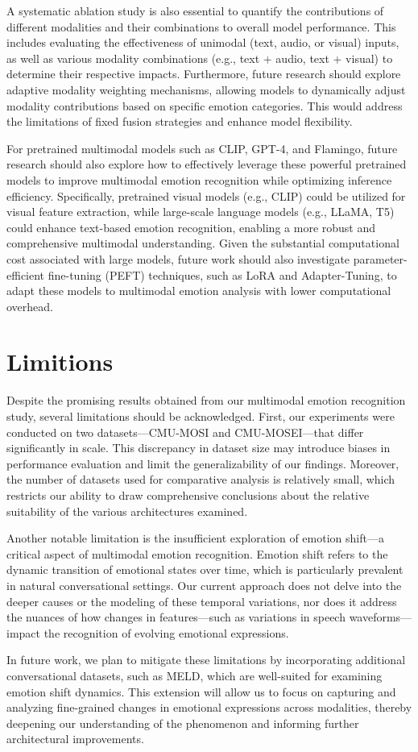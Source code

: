 \documentclass{article}
\begin{document}
A systematic ablation study is also essential to quantify the contributions of different modalities and their combinations to overall model performance. This includes evaluating the effectiveness of unimodal (text, audio, or visual) inputs, as well as various modality combinations (e.g., text + audio, text + visual) to determine their respective impacts. Furthermore, future research should explore adaptive modality weighting mechanisms, allowing models to dynamically adjust modality contributions based on specific emotion categories. This would address the limitations of fixed fusion strategies and enhance model flexibility.

For pretrained multimodal models such as CLIP, GPT-4, and Flamingo, future research should also explore how to effectively leverage these powerful pretrained models to improve multimodal emotion recognition while optimizing inference efficiency. Specifically, pretrained visual models (e.g., CLIP) could be utilized for visual feature extraction, while large-scale language models (e.g., LLaMA, T5) could enhance text-based emotion recognition, enabling a more robust and comprehensive multimodal understanding. Given the substantial computational cost associated with large models, future work should also investigate parameter-efficient fine-tuning (PEFT) techniques, such as LoRA and Adapter-Tuning, to adapt these models to multimodal emotion analysis with lower computational overhead.

\section{Limitions}
Despite the promising results obtained from our multimodal emotion recognition study, several limitations should be acknowledged. First, our experiments were conducted on two datasets—CMU-MOSI and CMU-MOSEI—that differ significantly in scale. This discrepancy in dataset size may introduce biases in performance evaluation and limit the generalizability of our findings. Moreover, the number of datasets used for comparative analysis is relatively small, which restricts our ability to draw comprehensive conclusions about the relative suitability of the various architectures examined.

Another notable limitation is the insufficient exploration of emotion shift—a critical aspect of multimodal emotion recognition. Emotion shift refers to the dynamic transition of emotional states over time, which is particularly prevalent in natural conversational settings. Our current approach does not delve into the deeper causes or the modeling of these temporal variations, nor does it address the nuances of how changes in features—such as variations in speech waveforms—impact the recognition of evolving emotional expressions.

In future work, we plan to mitigate these limitations by incorporating additional conversational datasets, such as MELD, which are well-suited for examining emotion shift dynamics. This extension will allow us to focus on capturing and analyzing fine-grained changes in emotional expressions across modalities, thereby deepening our understanding of the phenomenon and informing further architectural improvements.




\end{document}
